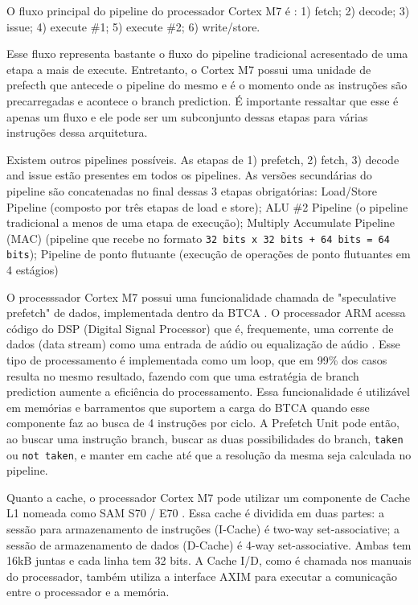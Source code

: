 \documentclass[10pt, a4paper]{article}
\begin{document}
O fluxo principal do pipeline do processador Cortex M7 é \autocite{cortex-m7-launches}: 1) fetch; 2) decode; 3) issue; 4) execute \#1; 5) execute \#2; 6) write/store.

Esse fluxo representa bastante o fluxo do pipeline tradicional acresentado de uma etapa a mais de execute. Entretanto, o Cortex M7 possui uma unidade de prefecth que antecede o pipeline do mesmo e é o momento onde as instruções são precarregadas e acontece o branch prediction. É importante ressaltar que esse é apenas um fluxo e ele pode ser um subconjunto dessas etapas para várias instruções dessa arquitetura.

Existem outros pipelines possíveis. As etapas de  1) prefetch, 2) fetch, 3) decode and issue estão presentes em todos os pipelines. As versões secundárias do pipeline são concatenadas no final dessas 3 etapas obrigatórias: Load/Store Pipeline (composto por três etapas de load e store); ALU \#2 Pipeline (o pipeline tradicional a menos de uma etapa de execução); Multiply Accumulate Pipeline (MAC) (pipeline que recebe no formato \texttt{32 bits x 32 bits + 64 bits = 64 bits}); Pipeline de ponto flutuante (execução de operações de ponto flutuantes em 4 estágios)

O processsador Cortex M7 possui uma funcionalidade chamada de "speculative prefetch" de dados, implementada dentro da BTCA \autocite{note-an4838}. O processador ARM acessa código do DSP (Digital Signal Processor) que é, frequemente, uma corrente de dados (data stream) como uma entrada de aúdio ou equalização de aúdio \autocite{cortex-m7-launches}. Esse tipo de processamento é implementada como um loop, que em 99\% dos casos resulta no mesmo resultado, fazendo com que uma estratégia de branch prediction aumente a eficiência do processamento. Essa funcionalidade é utilizável em memórias e barramentos que suportem a carga do BTCA quando esse componente faz ao busca de 4 instruções por ciclo. A Prefetch Unit pode então, ao buscar uma instrução branch, buscar as duas possibilidades do branch, \texttt{taken} ou \texttt{not taken}, e manter em cache até que a resolução da mesma seja calculada no pipeline.

Quanto a cache, o processador Cortex M7 pode utilizar um componente de Cache L1 nomeada como SAM S70 / E70 \autocite{note-an-15679}. Essa cache é dividida em duas partes: a sessão para armazenamento de instruções (I-Cache) é two-way set-associative; a sessão de armazenamento de dados (D-Cache) é 4-way set-associative. Ambas tem 16kB juntas e cada linha tem 32 bits. A Cache I/D, como é chamada nos manuais do processador, também utiliza a interface AXIM para executar a comunicação entre o processador e a memória.
\end{document}
